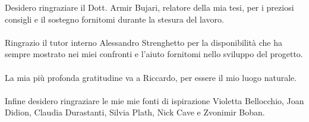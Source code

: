 
Desidero ringraziare il Dott. Armir Bujari, relatore della mia tesi, per i preziosi consigli e il sostegno fornitomi durante la stesura del lavoro. \\
\\
Ringrazio il tutor interno Alessandro Strenghetto per la disponibilità che ha sempre mostrato nei miei confronti e l’aiuto fornitomi nello sviluppo del progetto. \\
\\
La mia più profonda gratitudine va a Riccardo, per essere il mio luogo naturale. \\
\\
Infine desidero ringraziare le mie mie fonti di ispirazione Violetta Bellocchio, Joan Didion, Claudia Durastanti, Silvia Plath, Nick Cave e Zvonimir Boban.
